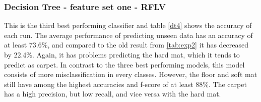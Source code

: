 \documentclass[USenglish]{ifimaster}  %
\begin{document}
\subsubsection{Decision Tree - feature set one - RFLV}
This is the third best performing classifier and table \ref{dt4} shows the accuracy of each run. The average performance of predicting unseen data has an accuracy of at least 73.6\%, and compared to the old result from \ref{tab:exp2} it has decreased by 22.4\%. Again, it has problems predicting the hard mat, which it tends to predict as carpet. In contrast to the three best performing models, this model consists of more misclassification in every classes. However, the floor and soft mat still have among the highest accuracies and f-score of at least 88\%. The carpet has a high precision, but low recall, and vice versa with the hard mat.
\end{document}
